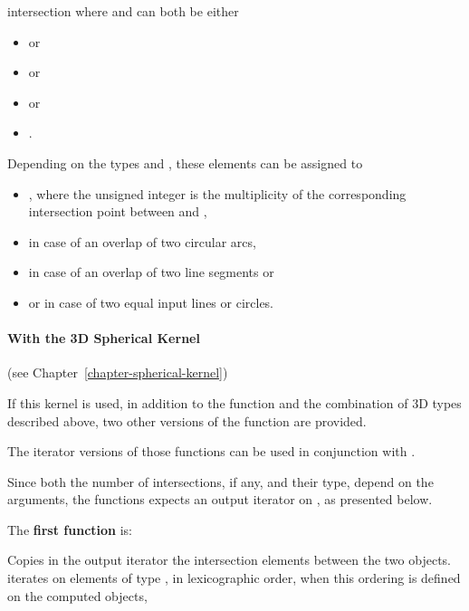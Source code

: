 \begin{ccRefFunction}{intersection}
where  and  can both be either
\begin{itemize}
\item {}  or
\item {}  or
\item {}  or
\item {} .
\end{itemize} 

Depending on the types  and , these
elements can be assigned to
\begin{itemize}
\item {} ,
where the unsigned integer is the multiplicity of the corresponding
intersection point between  and ,
\item {}  in case of an overlap of 
two circular arcs,
\item {}  in case of an overlap of two 
line segments or
\item {}  or 
 in case of two equal input lines or circles.
\end{itemize} 


\paragraph{With the 3D Spherical Kernel} (see Chapter~\ref{chapter-spherical-kernel}) 


If this kernel is used, in addition to the function and the
combination of 3D types described above, two other versions of the function
are provided.

The iterator versions of those functions can be used in conjunction
with .

Since both the number of intersections, if any, and their type,
depend on the arguments, the functions expects an output
iterator on , as presented below. 

The \textbf{first function} is:

{Copies in the output iterator the intersection elements between the
two objects.  iterates on
elements of type , in lexicographic order,
when this ordering is defined on the computed objects,}


\end{ccRefFunction}
